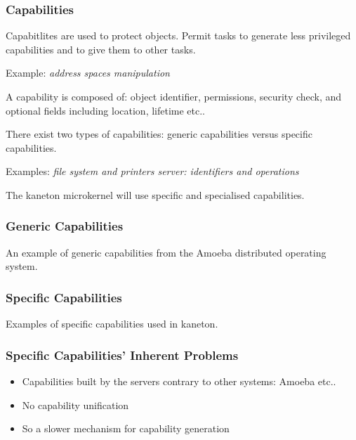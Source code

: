 \documentclass[8pt]{beamer}
\newcommand{\nl}[0]{\vspace{0.4cm}}
\begin{document}
\begin{frame}
  \frametitle{Capabilities}

  Capabitlites are used to protect objects. Permit tasks to generate
  less privileged capabilities and to give them to other tasks.

  \nl

  Example: \textit{address spaces manipulation}

  \nl

  A capability is composed of: object identifier, permissions,
  security check, and optional fields including location, lifetime
  etc..

  \nl

  There exist two types of capabilities: generic capabilities versus
  \alert{specific} capabilities.

  \nl

  Examples: \textit{file system and printers server: identifiers
    and operations}

  \nl

  The kaneton microkernel will use specific and specialised capabilities.
\end{frame}


\begin{frame}
  \frametitle{Generic Capabilities}

  An example of generic capabilities from the Amoeba distributed operating
  system.

  \begin{center}
  \end{center}
\end{frame}


\begin{frame}
  \frametitle{Specific Capabilities}

  Examples of specific capabilities used in kaneton.

  \begin{center}
  \end{center}
\end{frame}


\begin{frame}
  \frametitle{Specific Capabilities' Inherent Problems}

  \begin{itemize}[<+->]
    \item
      Capabilities built by the servers contrary to other systems:
      Amoeba etc..
    \item
      No capability unification
    \item
      So a slower mechanism for capability generation
  \end{itemize}

  \nl
\end{frame}
\end{document}
